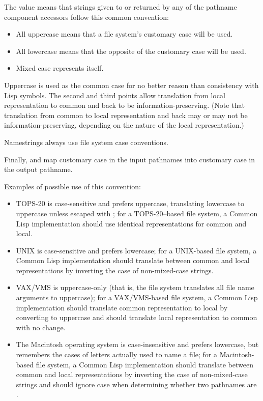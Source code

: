 \begin{newer}
  The value  means that strings given to 
  or returned by any of the pathname component accessors
  follow this common convention:
\begin{itemize}
\item All uppercase means that a file system's customary case will be used.
\item All lowercase means that the opposite of the customary case will be used.
\item Mixed case represents itself.
\end{itemize}
  Uppercase is used as the common case for no better reason than
  consistency with Lisp symbols.
  The second and third points allow translation from local representation to
  common and back to be information-preserving.  (Note that translation
  from common to local representation and back may or may not be information-preserving,
  depending on the nature of the local representation.)

  Namestrings always use  file system case conventions.

  Finally,  and  map customary case in the
  input pathnames into customary case in the output pathname.

  Examples of possible use of this convention:
\begin{itemize}
  \item TOPS-20 is case-sensitive and prefers uppercase,
  translating lowercase to uppercase unless escaped with ;
  for a TOPS-20--based
  file system, a Common Lisp implementation
  should use identical
  representations for common and local.

\item UNIX is case-sensitive and prefers lowercase; for a UNIX-based file system,
  a Common Lisp implementation should translate between
  common and local representations by inverting the case of non-mixed-case strings.

\item VAX/VMS is uppercase-only (that is, the file system translates all file
  name arguments to uppercase); for a VAX/VMS-based file system,
  a Common Lisp implementation should
  translate common representation to local by
  converting to uppercase and should translate local representation
  to common with no change.

\item The Macintosh operating system is case-insensitive and prefers lowercase,
  but remembers the cases of letters actually used to name a file;
  for a Macintosh-based file system, a Common Lisp implementation should translate
  between common and local representations by inverting the case of non-mixed-case strings
  and should ignore case when determining whether two pathnames are .
\end{itemize}


\end{newer}
